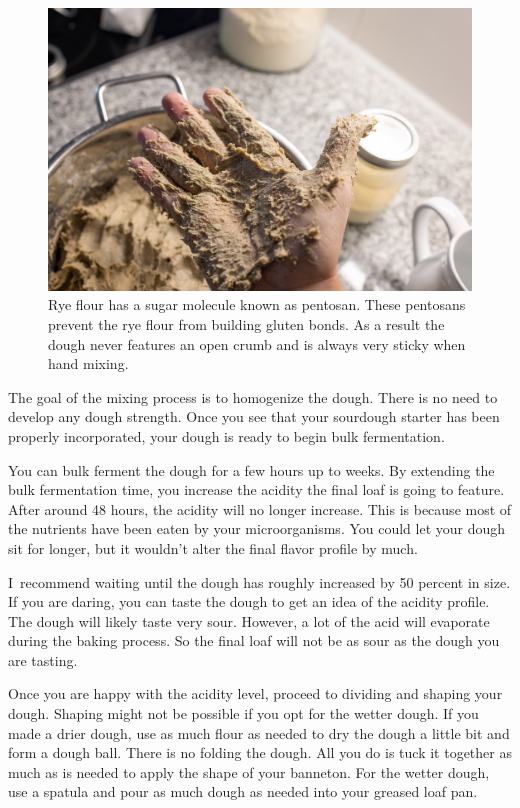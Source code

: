 \begin{figure}[!htb]
  \includegraphics[width=\textwidth]{sticky-hands}
  \caption{Rye flour has a sugar molecule known as pentosan. These pentosans prevent
  the rye flour from building gluten bonds. As a result the dough never features an
  open crumb and is always very sticky when hand mixing.}%
  \label{fig:non-wheat-sticky-hands}
\end{figure}

The goal of the mixing process is to homogenize the dough. There
is no need to develop any dough strength. Once you see that
your sourdough starter has been properly incorporated, your
dough is ready to begin bulk fermentation.

You can bulk ferment the dough for a few hours up to
weeks. By extending the bulk fermentation time, you increase
the acidity the final loaf is going to feature. After around
48 hours, the acidity will no longer increase. This is because
most of the nutrients have been eaten by your microorganisms.
You could let your dough sit for longer, but it wouldn't alter the
final flavor profile by much.

I~recommend waiting until the dough has roughly increased by
50 percent in size. If you are daring, you can taste the dough
to get an idea of the acidity profile. The dough will likely
taste very sour. However, a lot of the acid will evaporate
during the baking process. So the final loaf will not be
as sour as the dough you are tasting.

Once you are happy with the acidity level, proceed to dividing
and shaping your dough. Shaping might not be possible if you opt
for the wetter dough. If you made a drier dough, use as much
flour as needed to dry the dough a little bit and form a dough ball.
There is no folding the dough. All you do is tuck it together
as much as is needed to apply the shape of your banneton.
For the wetter dough, use a spatula and pour as much dough as
needed into your greased loaf pan.

